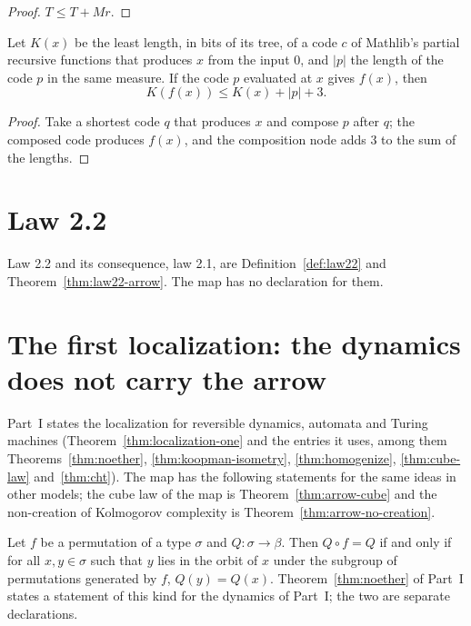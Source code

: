 \begin{proof}
  \leanok
  $T \le T + M r$.
\end{proof}

\begin{theorem}
  \label{thm:arrow-no-creation}
  \leanok
  Let $K(x)$ be the least length, in bits of its tree, of a code $c$ of Mathlib's partial recursive
  functions that produces $x$ from the input $0$, and $|p|$ the length of the code $p$ in the same
  measure. If the code $p$ evaluated at $x$ gives $f(x)$, then
  \[
    K(f(x)) \le K(x) + |p| + 3.
  \]
  \own{}
\end{theorem}

\begin{proof}
  \leanok
  Take a shortest code $q$ that produces $x$ and compose $p$ after $q$; the composed code produces
  $f(x)$, and the composition node adds $3$ to the sum of the lengths.
\end{proof}

\section{Law 2.2}
\label{sec:arrow-law22}

Law 2.2 and its consequence, law 2.1, are Definition~\ref{def:law22} and
Theorem~\ref{thm:law22-arrow}. The map has no declaration for them.

\section{The first localization: the dynamics does not carry the arrow}
\label{sec:arrow-loc1}

Part~I states the localization for reversible dynamics, automata and Turing machines
(Theorem~\ref{thm:localization-one} and the entries it uses, among them Theorems~\ref{thm:noether},
\ref{thm:koopman-isometry}, \ref{thm:homogenize}, \ref{thm:cube-law} and~\ref{thm:cht}). The map has the
following statements for the same ideas in other models; the cube law of the map is
Theorem~\ref{thm:arrow-cube} and the non-creation of Kolmogorov complexity is
Theorem~\ref{thm:arrow-no-creation}.

\begin{theorem}
  \label{thm:arrow-noether-orbits}
  \leanok
  Let $f$ be a permutation of a type $\sigma$ and $Q : \sigma \to \beta$. Then $Q \circ f = Q$ if and
  only if for all $x, y \in \sigma$ such that $y$ lies in the orbit of $x$ under the subgroup of
  permutations generated by $f$, $Q(y) = Q(x)$. Theorem~\ref{thm:noether} of Part~I states a
  statement of this kind for the dynamics of Part~I; the two are separate declarations.
  \own{}
\end{theorem}

